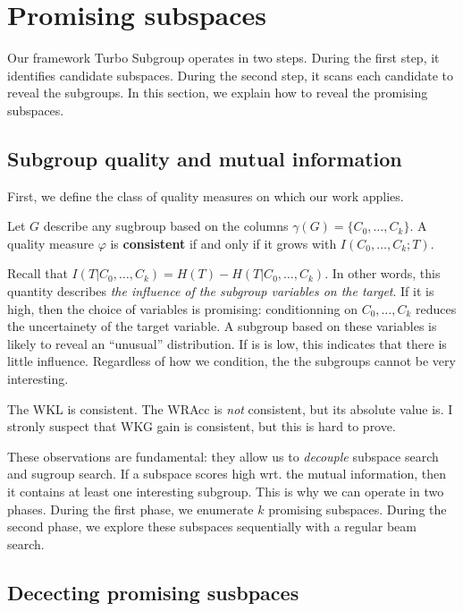 \section{Promising subspaces}

Our framework Turbo Subgroup operates in two steps. During the first step, it
identifies candidate subspaces.  During the second step, it scans each
candidate to reveal the subgroups. In this section, we explain how to reveal
the promising subspaces.

\subsection{Subgroup quality and mutual information}
First, we define the class of quality measures on which our work applies.
\begin{definition}
    Let $G$ describe any sugbroup based on the columns $\gamma(G) = \{C_0,
\ldots, C_k\}$.  A quality measure $\varphi$ is \textbf{consistent} if and only
if it grows with $I(C_0, \ldots, C_k; T)$.  
\end{definition}

Recall that $I(T | C_0, \ldots, C_k) = H(T) - H(T | C_0, \ldots,C_k)$. In other
words, this quantity describes \emph{the influence of the subgroup variables on
the target}. If it is high, then the choice of variables is promising:
conditionning on $C_0, \ldots,C_k$ reduces the uncertainety of the target
variable.  A subgroup based on these variables is likely to reveal an
``unusual'' distribution. If is is low, this indicates that there is little
influence. Regardless of how we condition, the the subgroups cannot be very
interesting.

\begin{lemma}
    The WKL is consistent. The WRAcc is \emph{not} consistent, but its absolute value
    is. I stronly suspect that WKG gain is consistent, but this is hard to
    prove.
\end{lemma}

These observations are fundamental: they allow us to \emph{decouple} subspace search and
sugroup search. If a subspace scores high wrt. the mutual information, then it
contains at least one interesting subgroup. This is why we can operate in two
phases. During the first phase, we enumerate $k$ promising subspaces. During the
second phase, we explore these subspaces sequentially with a regular beam
search.

\subsection{Dececting promising susbpaces}

